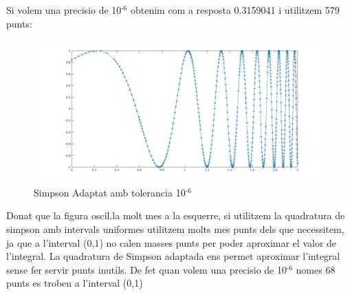 \documentclass[11pt]{article}
\begin{document}
Si volem una precisio de 10\(^{\text{-6}}\) obtenim com a resposta 0.3159041 i utilitzem 579 punts:

\begin{figure}[htbp]
\centering
\includegraphics[width=.9\linewidth]{./SimpsonAdaptat2.jpg}
\caption{\label{fig:org2803368}
Simpson Adaptat amb tolerancia 10\(^{\text{-6}}\)}
\end{figure}

Donat que la figura oscil.la molt mes a la esquerre, si utilitzem la quadratura de simpson amb intervals uniformes utilitzem molts mes punts dels que necessitem, ja que a l'interval (0,1) no calen masses punts per poder aproximar el valor de l'integral. La quadratura de Simpson adaptada ens permet aproximar l'integral sense fer servir punts inutils. De fet quan volem una precisio de 10\(^{\text{-6}}\) nomes 68 punts es troben a l'interval (0,1)
\end{document}

